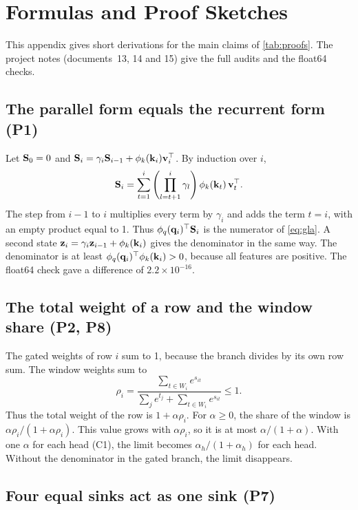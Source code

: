 \chapter{Formulas and Proof Sketches}
\label{app:formulas}

This appendix gives short derivations for the main claims of \cref{tab:proofs}. The project notes (documents~13, 14 and 15) give the full audits and the float64 checks.

\section{The parallel form equals the recurrent form (P1)}

Let $\mathbf{S}_0 = 0$ and $\mathbf{S}_i = \gamma_i \mathbf{S}_{i-1} + \phi_k(\mathbf{k}_i)\mathbf{v}_i^\top$. By induction over $i$,
\begin{equation}
\mathbf{S}_i = \sum_{t=1}^{i} \left( \prod_{l=t+1}^{i} \gamma_l \right) \phi_k(\mathbf{k}_t)\, \mathbf{v}_t^\top .
\end{equation}
The step from $i-1$ to $i$ multiplies every term by $\gamma_i$ and adds the term $t = i$, with an empty product equal to 1. Thus $\phi_q(\mathbf{q}_i)^\top \mathbf{S}_i$ is the numerator of \cref{eq:gla}. A second state $\mathbf{z}_i = \gamma_i \mathbf{z}_{i-1} + \phi_k(\mathbf{k}_i)$ gives the denominator in the same way. The denominator is at least $\phi_q(\mathbf{q}_i)^\top\phi_k(\mathbf{k}_i) > 0$, because all features are positive. The float64 check gave a difference of $2.2 \times 10^{-16}$.

\section{The total weight of a row and the window share (P2, P8)}

The gated weights of row $i$ sum to 1, because the branch divides by its own row sum. The window weights sum to
\begin{equation}
\rho_i = \frac{\sum_{t \in W_i} e^{s_{it}}}{\sum_{j} e^{t_j} + \sum_{t \in W_i} e^{s_{it}}} \le 1 .
\end{equation}
Thus the total weight of the row is $1 + \alpha\rho_i$. For $\alpha \ge 0$, the share of the window is $\alpha\rho_i / (1 + \alpha\rho_i)$. This value grows with $\alpha\rho_i$, so it is at most $\alpha/(1 + \alpha)$. With one $\alpha$ for each head (C1), the limit becomes $\alpha_h/(1+\alpha_h)$ for each head. Without the denominator in the gated branch, the limit disappears.

\section{Four equal sinks act as one sink (P7)}

